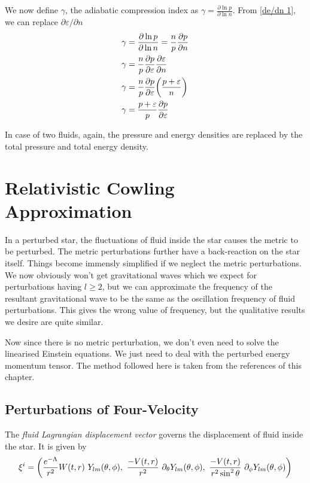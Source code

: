 \documentclass[12pt, letterpaper]{report}
\begin{document}
We now define $\gamma$, the adiabatic compression index as $\gamma= \frac{\partial \ln p}{\partial \ln n}$. From \cref{de/dn 1}, we can replace $\partial \varepsilon/ \partial n$
\begin{align}
    \gamma&= \frac{\partial \ln p}{\partial \ln n} = \frac{n}{p}\frac{\partial p}{\partial n}\nonumber\\
    \gamma&= \frac{n}{p}\frac{\partial p}{\partial \varepsilon}\frac{\partial \varepsilon}{\partial n}\nonumber\\
    \gamma&= \frac{n}{p}\frac{\partial p}{\partial \varepsilon}\qty(\frac{p+\varepsilon}{n})\nonumber\\
    \gamma&= \frac{p+\varepsilon}{p}\frac{\partial p}{\partial \varepsilon} \label{gamma}
\end{align}

In case of two fluids, again, the pressure and energy densities are replaced by the total pressure and total energy density. 


\section{Relativistic Cowling Approximation}

In a perturbed star, the fluctuations of fluid inside the star causes the metric to be perturbed. The metric perturbations further have a back-reaction on the star itself. Things become immensly simplified if we neglect the metric perturbations. We now obviously won't get gravitational waves which we expect for perturbations having $l\geq 2$, but we can approximate the frequency of the resultant gravitational wave to be the same as the oscillation frequency of fluid perturbations. This gives the wrong value of frequency, but the qualitative results we desire are quite similar. 

Now since there is no metric perturbation, we don't even need to solve the linearised Einstein equations. We just need to deal with the perturbed energy momentum tensor. The method followed here is taken from the references of this chapter. 

\subsection{Perturbations of Four-Velocity}

The \emph{fluid Lagrangian displacement vector} governs the displacement of fluid inside the star. It is given by
\begin{equation}
    \xi^i= \qty(\frac{e^{-\Lambda}}{r^2}W(t,r)\  Y_{lm}(\theta, \phi),\ \frac{-V(t,r)}{r^2} \ \partial_\theta Y_{lm}(\theta, \phi), \ \frac{-V(t,r)}{r^2\sin^2\theta}\  \partial_\phi Y_{lm}(\theta, \phi))    
\end{equation}
\end{document}
